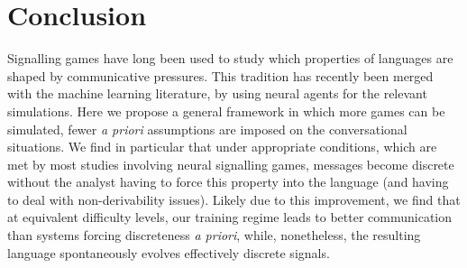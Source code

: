 \documentclass[11pt,a4paper]{article}
\newcommand{\nbEC}[1]{{\leavevmode\color{blue}{\scriptsize#1}}}
\begin{document}
\nbEC{We can either drop the discussion section, or move there the last paragraph of the communicative success and discreteness sections, adding a note saying that compositionality failed (but that high level of compositionality where never reached?).}

\section{Conclusion}

Signalling games have long been used to study which properties of languages are shaped by communicative pressures. This tradition has recently been merged with the machine learning literature, by using neural agents for the relevant simulations. Here we propose a general framework in which more games can be simulated, fewer \emph{a priori} assumptions are imposed on the conversational situations. We find in particular that under appropriate conditions, which are met by most\nbEC{all} studies involving neural signalling games, messages become discrete without the analyst having to force this property into the language (and having to deal with non-derivability issues). Likely due to this improvement, we find that at equivalent difficulty levels, our training regime leads to better communication than systems forcing discreteness \emph{a priori}, while, nonetheless, the resulting language spontaneously evolves effectively discrete signals. 






\end{document}
